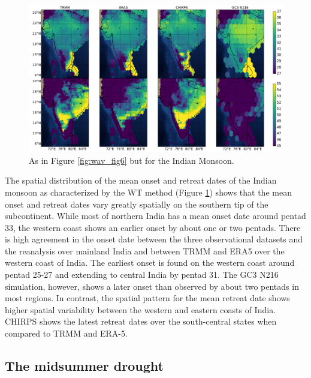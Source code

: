 \begin{figure}
\centering
 \includegraphics[width=\linewidth]{figures/wav_fig9.pdf}
\caption[Onset and retreat dates spatial distribution in Indian monsoon]{ As in Figure \ref{fig:wav_fig6} but for the Indian Monsoon.  }
\label{fig:wav_fig9}
\end{figure}

The spatial distribution of the mean onset and retreat dates of the Indian monsoon as characterized by the WT method (Figure \ref{fig:wav_fig9}) shows that the mean onset and retreat dates vary greatly spatially on the southern tip of the subcontinent. While most of northern India has a mean onset date around pentad 33, the western coast shows an earlier onset by about one or two pentads. There is high agreement in the onset date between the three observational datasets and the reanalysis over mainland India and between TRMM and ERA5 over the western coast of India. The earliest onset is found on the western coast around pentad 25-27 and extending to central India by pentad 31. 
The GC3 N216 simulation, however, shows a later onset than observed by about two pentads in most regions. In contrast, the spatial pattern for the mean retreat date shows higher spatial variability between the western and eastern coasts of India. CHIRPS shows the latest retreat dates over the south-central states when compared to TRMM and ERA-5. 

\subsection{The midsummer drought}

